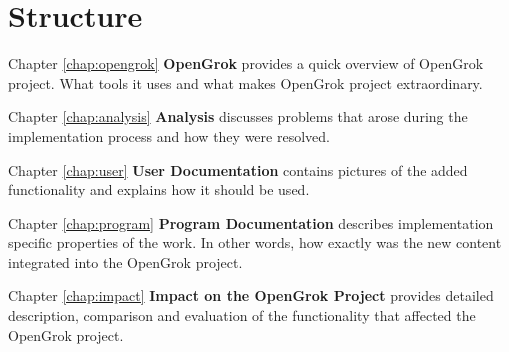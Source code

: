 \section{Structure}

Chapter \ref{chap:opengrok} \textbf{OpenGrok} provides a quick overview of OpenGrok project. What tools it uses and what
makes OpenGrok project extraordinary.

Chapter \ref{chap:analysis} \textbf{Analysis} discusses problems that arose during the implementation process and how
they were resolved.

Chapter \ref{chap:user} \textbf{User Documentation} contains pictures of the added functionality and explains how it
should be used.

Chapter \ref{chap:program} \textbf{Program Documentation} describes implementation specific properties of the work.
In other words, how exactly was the new content integrated into the OpenGrok project.

Chapter \ref{chap:impact} \textbf{Impact on the OpenGrok Project} provides detailed description, comparison and
evaluation of the functionality that affected the OpenGrok project.

